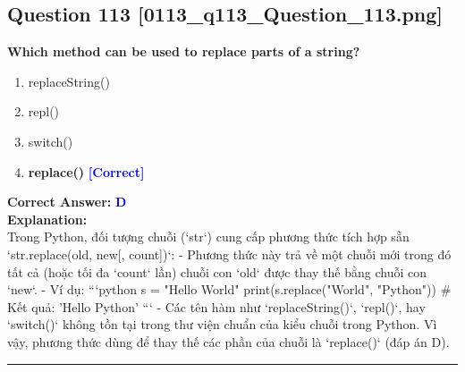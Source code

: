 \documentclass[11pt,a4paper]{article}
\begin{document}
\begin{minipage}{\textwidth}
\subsection*{Question 113 \quad \footnotesize{[0113_q113_Question_113.png]}}
\noindent \textbf{Which method can be used to replace parts of a string?}

\begin{enumerate}[label=\Alph*.]
    \item replaceString()
    \item repl()
    \item switch()
    \item \textbf{replace()} \hfill \textcolor{blue}{\textbf{[Correct]}}
\end{enumerate}

\noindent \textbf{Correct Answer:} \textcolor{blue}{\textbf{D}} \\[4pt]
\noindent \textbf{Explanation:}\\
Trong Python, đối tượng chuỗi (`str`) cung cấp phương thức tích hợp sẵn `str.replace(old, new[, count])`:\newline
- Phương thức này trả về một chuỗi mới trong đó tất cả (hoặc tối đa `count` lần) chuỗi con `old` được thay thế bằng chuỗi con `new`.\newline
- Ví dụ:\newline
  ```python\newline
  s = "Hello World"\newline
  print(s.replace("World", "Python"))  # Kết quả: 'Hello Python'\newline
  ```\newline
- Các tên hàm như `replaceString()`, `repl()`, hay `switch()` không tồn tại trong thư viện chuẩn của kiểu chuỗi trong Python.\newline
Vì vậy, phương thức dùng để thay thế các phần của chuỗi là `replace()` (đáp án D).
\end{minipage}
\vspace{0.8cm}
\hrule
\vspace{0.5cm}
\end{document}
